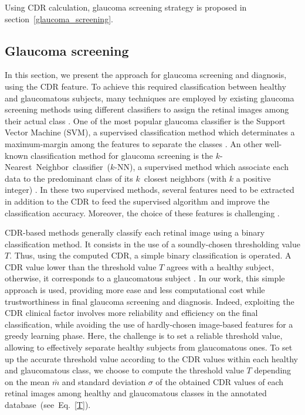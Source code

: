 

Using CDR calculation, glaucoma screening strategy is proposed in \mbox{section \ref{glaucoma_screening}}.

\subsection{\label{glaucoma_screening}Glaucoma screening}

In this section, we present the approach for glaucoma screening and diagnosis, using the CDR feature.
To achieve this required classification between healthy and glaucomatous subjects, many techniques are employed by existing glaucoma screening methods using different classifiers to assign the retinal images among their actual class \citep{singh2}.
One of the most popular glaucoma classifier is the Support Vector Machine (SVM), a supervised classification method which determinates a maximum-margin among the features to separate the classes \citep{maheshwari}. An other well-known classification method for glaucoma screening is the \mbox{$k$-Nearest Neighbor classifier ($k$-NN)}, a supervised method which associate each data to the predominant class of its \mbox{$k$ closest} neighbors (with $k$ a positive integer) \citep{bock}.
In these two supervised methods, several features need to be extracted in addition to the CDR to feed the supervised algorithm and improve the classification accuracy. Moreover, the choice of these features is challenging \citep{joshi}.

CDR-based methods generally classify each retinal image using a binary classification method. It consists in the use of a soundly-chosen thresholding value $T$. Thus, using the computed CDR, a simple binary classification is operated. A CDR value lower than the threshold value  $T$ agrees with a healthy subject, otherwise, it corresponds to a glaucomatous subject \citep{cheng,singh2,yin}. 
In our work, this simple approach is used, providing more ease and less computational cost while trustworthiness in final glaucoma screening and diagnosis. Indeed, exploiting the CDR clinical factor involves more reliability and efficiency on the final classification, while avoiding the use of hardly-chosen image-based features for a greedy learning phase. Here, the challenge is to set a reliable threshold value, allowing to effectively separate healthy subjects from glaucomatous ones.
To set up the accurate threshold value according to the CDR values within each healthy and glaucomatous class, we choose to compute the threshold value $T$ depending on the mean $\bar{m}$ and standard deviation $\sigma$ of the obtained CDR values of each retinal images among healthy and glaucomatous classes in the annotated \mbox{database (see \mbox{Eq. \ref{T}})}. 

